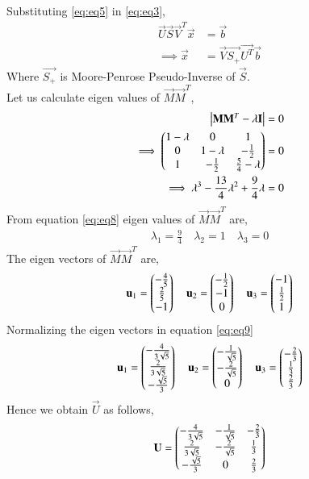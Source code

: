 \documentclass[journal,12pt,twocolumn]{IEEEtran}
\begin{document}
Substituting \eqref{eq:eq5} in \eqref{eq:eq3},
\begin{align}
\vec{U}\vec{S}\vec{V}^T\vec{x} & = \vec{b}\\
\implies\vec{x} &= \vec{V}\vec{S_+}\vec{U^T}\vec{b}\label{eq:eq7}
\end{align}
Where $\vec{S_+}$ is Moore-Penrose Pseudo-Inverse of $\vec{S}$. \\
Let us calculate eigen values of $\vec{M}\vec{M}^T$,
\begin{align}
\begin{vmatrix}\mathbf{M}\mathbf{M}^T - \lambda\mathbf{I}\end{vmatrix} &= 0\\
\implies\begin{pmatrix}1-\lambda&0&1\\0&1-\lambda&-\frac{1}{2}\\1&-\frac{1}{2}&\frac{5}{4}-\lambda\end{pmatrix} &=0\\
\implies\lambda^3-\frac{13}{4}\lambda^2+\frac{9}{4}\lambda &=0 \label{eq:eq8}
\end{align}
From equation \eqref{eq:eq8} eigen values of $\vec{M}\vec{M}^T$ are,
\begin{align}
\lambda_1 = \frac{9}{4} \quad
\lambda_2 = 1 \quad
\lambda_3 = 0
\end{align}
The eigen vectors of $\vec{M}\vec{M}^T$ are,
\begin{align}
\mathbf{u}_1=\begin{pmatrix}-\frac{4}{5}\\\frac{2}{5}\\-1\end{pmatrix}\quad
\mathbf{u}_2=\begin{pmatrix}-\frac{1}{2}\\-1\\0\end{pmatrix}\quad
\mathbf{u}_3=\begin{pmatrix}-1\\\frac{1}{2}\\1\end{pmatrix}\label{eq:eq9}
\end{align}
Normalizing the eigen vectors in equation \eqref{eq:eq9}
\begin{align}
\mathbf{u}_1=\begin{pmatrix}-\frac{4}{3\sqrt{5}}\\\frac{2}{3\sqrt{5}}\\-\frac{\sqrt{5}}{3}\end{pmatrix}\quad
\mathbf{u}_2=\begin{pmatrix}-\frac{1}{\sqrt{5}}\\-\frac{2}{\sqrt{5}}\\0\end{pmatrix}\quad
\mathbf{u}_3=\begin{pmatrix}-\frac{2}{3}\\\frac{1}{3}\\\frac{2}{3}\end{pmatrix}
\end{align}
Hence we obtain $\vec{U}$ as follows,
\begin{align}
\mathbf{U}=\begin{pmatrix}-\frac{4}{3\sqrt{5}}&-\frac{1}{\sqrt{5}}&-\frac{2}{3}\\\frac{2}{3\sqrt{5}}&-\frac{2}{\sqrt{5}}&\frac{1}{3}\\
-\frac{\sqrt{5}}{3}&0&\frac{2}{3}\end{pmatrix}\label{eq:eq10}
\end{align}
\end{document}
